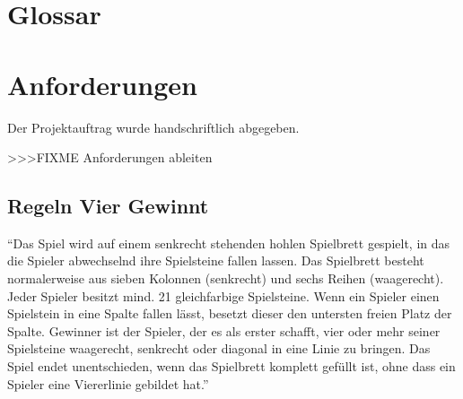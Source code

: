 \documentclass[a4paper, 10pt, fleqn]{article}
\begin{document}
\section{Glossar}

\section{Anforderungen}
Der Projektauftrag wurde handschriftlich abgegeben.

>>>FIXME Anforderungen ableiten

\subsection{Regeln Vier Gewinnt}
“Das Spiel wird auf einem senkrecht stehenden hohlen Spielbrett gespielt, in 
das die Spieler abwechselnd ihre Spielsteine fallen lassen. Das Spielbrett 
besteht normalerweise aus sieben Kolonnen (senkrecht) und sechs Reihen 
(waagerecht). Jeder Spieler besitzt mind. 21 gleichfarbige Spielsteine. Wenn 
ein Spieler einen Spielstein in eine Spalte fallen lässt, besetzt dieser den 
untersten freien Platz der Spalte. Gewinner ist der Spieler, der es als erster 
schafft, vier oder mehr seiner Spielsteine waagerecht, senkrecht oder diagonal 
in eine Linie zu bringen. Das Spiel endet unentschieden, wenn das Spielbrett 
komplett gefüllt ist, ohne dass ein Spieler eine Viererlinie gebildet hat.”
\end{document}
